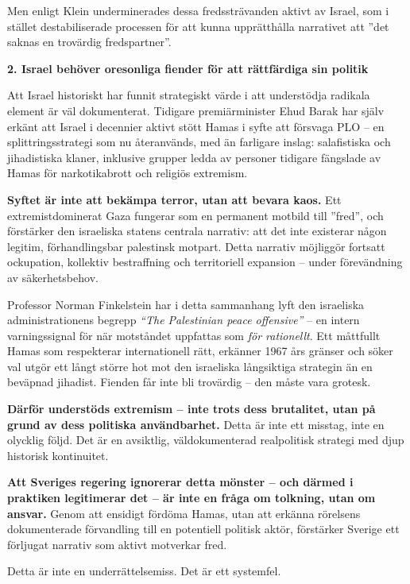 \documentclass[12pt]{article}
\begin{document}
Men enligt Klein underminerades dessa fredssträvanden aktivt av Israel, som i stället destabiliserade processen för att kunna upprätthålla narrativet att ”det saknas en trovärdig fredspartner”.

\textbf{2. Israel behöver oresonliga fiender för att rättfärdiga sin politik}

Att Israel historiskt har funnit strategiskt värde i att understödja radikala element är väl dokumenterat. Tidigare premiärminister Ehud Barak har själv erkänt att Israel i decennier aktivt stött Hamas i syfte att försvaga PLO – en splittringsstrategi som nu återanvänds, med än farligare inslag: salafistiska och jihadistiska klaner, inklusive grupper ledda av personer tidigare fängslade av Hamas för narkotikabrott och religiös extremism.

\textbf{Syftet är inte att bekämpa terror, utan att bevara kaos.} Ett extremistdominerat Gaza fungerar som en permanent motbild till ”fred”, och förstärker den israeliska statens centrala narrativ: att det inte existerar någon legitim, förhandlingsbar palestinsk motpart. Detta narrativ möjliggör fortsatt ockupation, kollektiv bestraffning och territoriell expansion – under förevändning av säkerhetsbehov.

Professor Norman Finkelstein har i detta sammanhang lyft den israeliska administrationens begrepp \textit{“The Palestinian peace offensive”} – en intern varningssignal för när motståndet uppfattas som \textit{för rationellt}. Ett måttfullt Hamas som respekterar internationell rätt, erkänner 1967 års gränser och söker val utgör ett långt större hot mot den israeliska långsiktiga strategin än en beväpnad jihadist. Fienden får inte bli trovärdig – den måste vara grotesk.

\textbf{Därför understöds extremism – inte trots dess brutalitet, utan på grund av dess politiska användbarhet.} Detta är inte ett misstag, inte en olycklig följd. Det är en avsiktlig, väldokumenterad realpolitisk strategi med djup historisk kontinuitet.

\medskip

\textbf{Att Sveriges regering ignorerar detta mönster – och därmed i praktiken legitimerar det – är inte en fråga om tolkning, utan om ansvar.} Genom att ensidigt fördöma Hamas, utan att erkänna rörelsens dokumenterade förvandling till en potentiell politisk aktör, förstärker Sverige ett förljugat narrativ som aktivt motverkar fred.

Detta är inte en underrättelsemiss. Det är ett systemfel.
\end{document}
